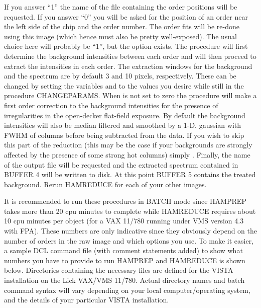\noindent
If you answer ``1'' the name of the file containing the order positions will
be requested. If you answer ``0'' you will be asked for the position of an
order near the left side of the chip and the order number.  The order fits
will be re-done using this image (which hence must also be pretty
well-exposed).  The usual choice here will probably be ``1'', but the option
exists. The procedure will first determine the background intensities between
each order and will then proceed to extract the intensities in each order.
The extraction windows for the background and the spectrum are by default 3
and 10 pixels, respectively.  These can be changed by setting the variables
 and  to the values you desire while still in the
procedure {\tenit CHANGEPARAMS}. When  is not set to zero the
procedure will make a first order correction to the background intensities for
the presence of irregularities in the open-decker flat-field exposure. By
default the background intensities will also be median filtered and smoothed
by a 1-D. gaussian with FWHM of  columns before being
subtracted from the data. If you wish to skip this part of the reduction (this
may be the case if your backgrounds are strongly affected by the presence of
some strong hot columns) simply . Finally, the name of the
output file will be requested and the extracted spectrum contained in BUFFER 4
will be written to disk.  At this point BUFFER 5 contains the treated
background.  Rerun {\tenit HAMREDUCE} for each of your other images.

It is recommended to run these procedures in BATCH mode since {\tenit HAMPREP}
takes more than 20 cpu minutes to complete while {\tenit HAMREDUCE} requires
about 10 cpu minutes per object (for a VAX 11/780 running under VMS version
4.3 with FPA).  These numbers are only indicative since they obviously depend
on the number of orders in the raw image and which options you use. To make it
easier, a sample DCL command file (with comment statements added) to show what
numbers you have to provide to run {\tenit HAMPREP} and {\tenit HAMREDUCE} is
shown below.  Directories containing the necessary files are defined for the
VISTA installation on the Lick VAX/VMS 11/780.  Actual directory names and
batch command syntax will vary depending on your local computer/operating
system, and the details of your particular VISTA installation.

\vskip 0.5in

